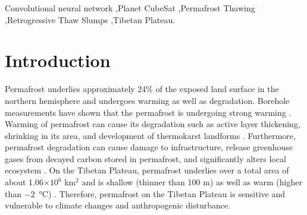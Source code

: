 \documentclass[preprint,12pt,authoryear]{elsarticle}
\begin{document}
\begin{frontmatter}
\begin{abstract}
\end{abstract}

\begin{keyword}


Convolutional neural network \sep Planet CubeSat  \sep Permafrost Thawing  \sep Retrogressive Thaw Slumps \sep Tibetan Plateau.

\end{keyword}

\end{frontmatter}


\section{Introduction}
\label{sec_intro}

Permafrost underlies approximately 24\% of the exposed land surface in the northern hemisphere \citep{zhang_statistics_1999} and undergoes warming as well as degradation. Borehole measurements have shown that the permafrost is undergoing strong warming  \citep{marchenko_permafrost_2007,osterkamp2005recent,romanovsky_thermal_2010,romanovsky_permafrost_2010,wu_recent_2008,zhao_thermal_2010,biskaborn2019permafrost}. Warming of permafrost can cause its degradation such as active layer thickening, shrinking in its area, and development of thermokarst landforms \citep{zhao_thermal_2010,akerman_thawing_2008,czudek_thermokarst_1970,jorgenson_response_2005,osterkamp_characteristics_2007}. Furthermore, permafrost degradation can cause damage to infrastructure, release greenhouse gases from decayed carbon stored in permafrost, and significantly alters local ecosystem \citep{tong_effect_1996,grosse_vulnerability_2011,olefeldt_circumpolar_2016,schuur_climate_2015,schuster2018permafrost}. On the Tibetan Plateau, permafrost underlies over a total area of about 1.06$\times10^6$ km$^2$ and is shallow (thinner than 100 m) as well as warm (higher than \SI{-2}{\celsius}) \citep{zhou_geocryology_2000}. Therefore, permafrost on the Tibetan Plateau is sensitive and vulnerable to climate changes and anthropogenic disturbance. %
\end{document}
